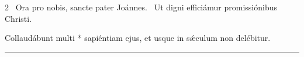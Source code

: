 \documentclass[9pt,twoside]{extarticle}
\begin{document}
\begin{multicols}{2}
~Ora pro nobis, sancte pater Joánnes. ~Ut digni efficiámur promissiónibus Christi.

\smallskip
{} Collaudábunt multi * sapiéntiam ejus, et usque in sǽculum non delébitur.

\begin{center}\textcolor{red}{\rule{\linewidth}{0.5pt}} \end{center}

%
%
%
%
%

\end{multicols}
\end{document}
